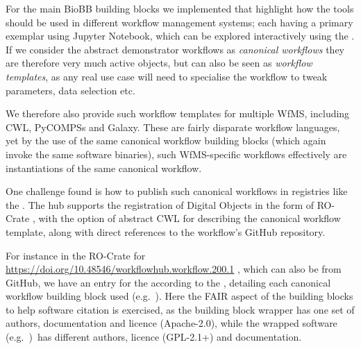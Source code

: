 For the main BioBB building blocks we implemented  that highlight how the tools should be used in different workflow management systems; each having a primary exemplar using Jupyter Notebook, which can be explored interactively using the .
If we consider the abstract demonstrator workflows as \emph{canonical workflows} they are therefore very much active objects, but can also be seen as \emph{workflow templates}, as any real use case will need to specialise the workflow to tweak parameters, data selection etc.

We therefore also provide such workflow templates for multiple WfMS, including CWL, PyCOMPSs and Galaxy.
These are fairly disparate workflow languages, yet by the use of the same canonical workflow building blocks (which again invoke the same software binaries), such WfMS-specific workflows effectively are instantiations of the same canonical workflow.

One challenge found is how to publish such canonical workflows in registries like the .
The hub supports the registration of Digital Objects in the form of RO-Crate \cite{Soiland-Reyes 2022a}, with the option of abstract CWL for describing the canonical workflow template, along with direct references to the workflow's GitHub repository.

\clearpage %
For instance in the RO-Crate for \url{https://doi.org/10.48546/workflowhub.workflow.200.1} \cite{Hospital 2021a}, which can also be
 from GitHub, we have an entry for the 
according to the
, 
detailing each canonical workflow building block used 
(e.g.~).
Here the FAIR aspect of the building blocks to help software citation is exercised, as the building block wrapper has one set of authors, documentation and licence (Apache-2.0), while the wrapped software 
(e.g.~)~has different authors, licence (GPL-2.1+) and documentation.

